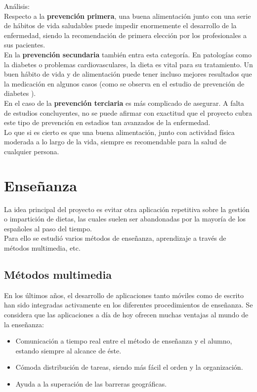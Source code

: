 Análisis:\\
Respecto a la \textbf{prevención primera}, una buena alimentación junto con una serie de hábitos de vida saludables puede impedir enormemente el desarrollo de la enfermedad, siendo la recomendación de primera elección por los profesionales a sus pacientes.\\
En la \textbf{prevención secundaria} también entra esta categoría. En patologías como la diabetes o problemas cardiovasculares, la dieta es vital para su tratamiento. Un buen hábito de vida y de alimentación puede tener incluso mejores resultados que la medicación en algunos casos (como se observa en el estudio de prevención de diabetes \cite{DPP}).
\\
En el caso de la \textbf{prevención terciaria} es más complicado de asegurar. A falta de estudios concluyentes, no se puede afirmar con exactitud que el proyecto cubra este tipo de prevención en estadios tan avanzados de la enfermedad.\\

Lo que si es cierto es que una buena alimentación, junto con actividad física moderada a lo largo de la vida, siempre es recomendable para la salud de cualquier persona.\\
\section{Enseñanza}
La idea principal del proyecto es evitar otra aplicación repetitiva sobre la gestión o impartición de dietas, las cuales suelen ser abandonadas por la mayoría de los españoles al paso del tiempo.\\

Para ello se estudió varios métodos de enseñanza, aprendizaje a través de métodos multimedia, etc. 
\subsection{Métodos multimedia}
En los últimos años, el desarrollo de aplicaciones tanto móviles como de escrito han sido integradas activamente en los diferentes procedimientos de enseñanza. Se considera que las aplicaciones a día de hoy ofrecen muchas ventajas al mundo de la enseñanza:
\begin{itemize}
\item	Comunicación a tiempo real entre el método de enseñanza y el alumno, estando siempre al alcance de éste.
\item	Cómoda distribución de tareas, siendo más fácil el orden y la organización.
\item	Ayuda a la superación de las barreras geográficas.
\end{itemize}

